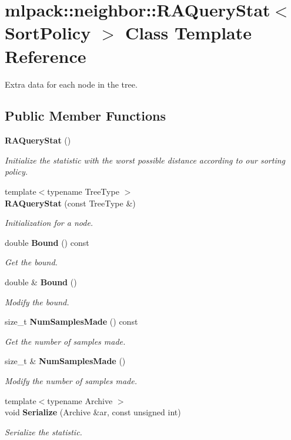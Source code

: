 \section{mlpack\+:\+:neighbor\+:\+:R\+A\+Query\+Stat$<$ Sort\+Policy $>$ Class Template Reference}
\label{classmlpack_1_1neighbor_1_1RAQueryStat}


Extra data for each node in the tree.  


\subsection*{Public Member Functions}
\begin{DoxyCompactItemize}
\item 
{\bf R\+A\+Query\+Stat} ()
\begin{DoxyCompactList}\small\item\em Initialize the statistic with the worst possible distance according to our sorting policy. \end{DoxyCompactList}\item 
{\footnotesize template$<$typename Tree\+Type $>$ }\\{\bf R\+A\+Query\+Stat} (const Tree\+Type \&)
\begin{DoxyCompactList}\small\item\em Initialization for a node. \end{DoxyCompactList}\item 
double {\bf Bound} () const 
\begin{DoxyCompactList}\small\item\em Get the bound. \end{DoxyCompactList}\item 
double \& {\bf Bound} ()
\begin{DoxyCompactList}\small\item\em Modify the bound. \end{DoxyCompactList}\item 
size\+\_\+t {\bf Num\+Samples\+Made} () const 
\begin{DoxyCompactList}\small\item\em Get the number of samples made. \end{DoxyCompactList}\item 
size\+\_\+t \& {\bf Num\+Samples\+Made} ()
\begin{DoxyCompactList}\small\item\em Modify the number of samples made. \end{DoxyCompactList}\item 
{\footnotesize template$<$typename Archive $>$ }\\void {\bf Serialize} (Archive \&ar, const unsigned int)
\begin{DoxyCompactList}\small\item\em Serialize the statistic. \end{DoxyCompactList}\end{DoxyCompactItemize}
